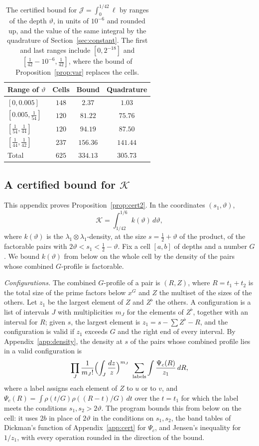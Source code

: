 \documentclass[aps,prd,twocolumn,superscriptaddress,nofootinbib,longbibliography,floatfix,showkeys,nobalancelastpage,amsmath,amssymb,10pt]{revtex4-2}
\theoremstyle{plain}
\theoremstyle{definition}
\theoremstyle{plain}
\newcommand{\Jc}{\mathcal{J}}
\begin{document}
\begin{table}[h]
\caption{The certified bound for $\Jc=\int_0^{1/42}\ell$ by ranges of the depth $\vartheta$, in units of $10^{-6}$ and rounded up, and the value of the same integral by the quadrature of Section~\ref{sec:constant}. The first and last ranges include $[0,2^{-18}]$ and $[\frac1{42}-10^{-6},\frac1{42}]$, where the bound of Proposition~\ref{prop:var} replaces the cells.}
\label{tab:cert}
\centering
\begin{tabular}{@{}lccc@{}}
\toprule
Range of $\vartheta$ & Cells & Bound & Quadrature\\
\midrule
$[0,0.005]$ & $148$ & $2.37$ & $1.03$\\
$[0.005,\frac1{54}]$ & $120$ & $81.22$ & $75.76$\\
$[\frac1{54},\frac1{44}]$ & $120$ & $94.19$ & $87.50$\\
$[\frac1{44},\frac1{42}]$ & $237$ & $156.36$ & $141.44$\\
\midrule
Total & $625$ & $334.13$ & $305.73$\\
\bottomrule
\end{tabular}
\end{table}

\subsection{A certified bound for \texorpdfstring{$\mathcal K$}{K}}\label{app:cert2}

This appendix proves Proposition~\ref{prop:cert2}. In the coordinates $(s_1,\vartheta)$,
\[
\mathcal K=\int_{1/42}^{1/6}k(\vartheta)\,d\vartheta,
\]
where $k(\vartheta)$ is the $\lambda_1\otimes\lambda_1$-density, at the size $s=\frac12+\vartheta$ of the product, of the factorable pairs with $2\vartheta<s_1<\frac12-\vartheta$. Fix a cell $[a,b]$ of depths and a number $G$. We bound $k(\vartheta)$ from below on the whole cell by the density of the pairs whose combined $G$-profile is factorable.

\emph{Configurations.} The combined $G$-profile of a pair is $(R,Z)$, where $R=t_1+t_2$ is the total size of the prime factors below $x^G$ and $Z$ the multiset of the sizes of the others. Let $z_1$ be the largest element of $Z$ and $Z^\flat$ the others. A configuration is a list of intervals $J$ with multiplicities $m_J$ for the elements of $Z^\flat$, together with an interval for $R$; given $s$, the largest element is $z_1=s-\sum Z^\flat-R$, and the configuration is valid if $z_1$ exceeds $G$ and the right end of every interval. By Appendix~\ref{app:density}, the density at $s$ of the pairs whose combined profile lies in a valid configuration is
\[
\prod_J\frac1{m_J!}\Bigl(\int_J\frac{dz}z\Bigr)^{m_J}\ \sum_{\text{labels}}\int\frac{\Psi_c(R)}{z_1}\,dR,
\]
where a label assigns each element of $Z$ to $u$ or to $v$, and $\Psi_c(R)=\int\rho(t/G)\rho((R-t)/G)\,dt$ over the $t=t_1$ for which the label meets the conditions $s_1,s_2>2\vartheta$. The program bounds this from below on the cell: it uses $2b$ in place of $2\vartheta$ in the conditions on $s_1,s_2$, the band tables of Dickman's function of Appendix~\ref{app:cert} for $\Psi_c$, and Jensen's inequality for $1/z_1$, with every operation rounded in the direction of the bound.
\end{document}
